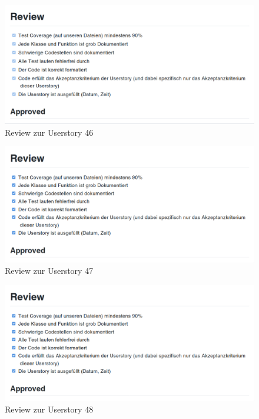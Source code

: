 \documentclass[accentcolor=tud9c,12pt,paper=a4]{tudreport}
\begin{document}
\begin{figure}[H]
\centering
\includegraphics[width=.8\textwidth]{code_review/us46}
\caption{Review zur Userstory 46}
\end{figure}

\begin{figure}[H]
\centering
\includegraphics[width=.8\textwidth]{code_review/us47}
\caption{Review zur Userstory 47}
\end{figure}

\begin{figure}[H]
\centering
\includegraphics[width=.8\textwidth]{code_review/us48}
\caption{Review zur Userstory 48}
\end{figure}
\end{document}
